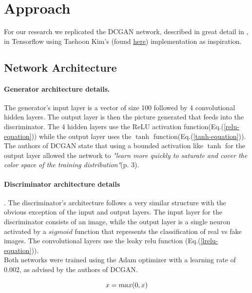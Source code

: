 
\section{Approach}
%
For our research we replicated the DCGAN network, described in great detail in \cite{DBLP:journals/corr/RadfordMC15}, in Tensorflow using Taehoon Kim's (found \href{https://github.com/carpedm20/DCGAN-tensorflow}{here}) implementation as inspiration.
\subsection{Network Architecture}
\paragraph{Generator architecture details.} The generator's input layer is a vector of size 100 followed by 4 convolutional hidden layers. The output layer is then the picture generated that feeds into the discriminator. The 4 hidden layers use the ReLU activation function(Eq.(\ref{relu-equation})) while the output layer uses the $\tanh$ function(Eq.(\ref{tanh-equation})). The authors of DCGAN state that using a bounded activation like $\tanh$ for the output layer allowed the network to \textit{"learn more quickly to saturate and cover the color space of the training distribution"}(p. 3).
\paragraph{Discriminator architecture details}. The discriminator's architecture  follows a very similar structure with the obvious exception of the input and output layers. The input layer for the discriminator consists of an image, while the output layer is a single neuron activated by a $sigmoid$ function that represents the classification of real vs fake images. The convolutional layers use the leaky relu function (Eq.(\ref{lrelu-equation})). \\
Both networks were trained using the Adam optimizer \cite{2014arXiv1412.6980K} with a learning rate of 0.002, as advised by the authors of DCGAN.

\begin{equation}
\label{relu-equation}
x = max(0, x)\\
\end{equation}

